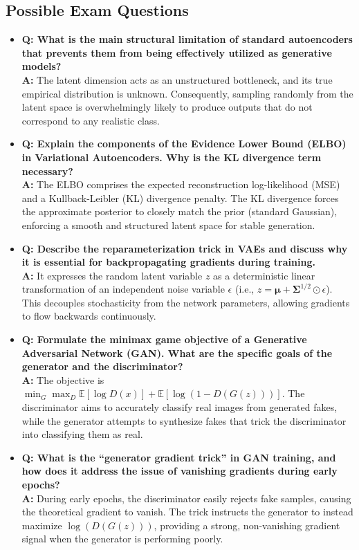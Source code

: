 \subsection{Possible Exam Questions}
\begin{itemize}
    \item \textbf{Q: What is the main structural limitation of standard autoencoders that prevents them from being effectively utilized as generative models?} \\
    \textbf{A:} The latent dimension acts as an unstructured bottleneck, and its true empirical distribution is unknown. Consequently, sampling randomly from the latent space is overwhelmingly likely to produce outputs that do not correspond to any realistic class.
    
    \item \textbf{Q: Explain the components of the Evidence Lower Bound (ELBO) in Variational Autoencoders. Why is the KL divergence term necessary?} \\
    \textbf{A:} The ELBO comprises the expected reconstruction log-likelihood (MSE) and a Kullback-Leibler (KL) divergence penalty. The KL divergence forces the approximate posterior to closely match the prior (standard Gaussian), enforcing a smooth and structured latent space for stable generation.
    
    \item \textbf{Q: Describe the reparameterization trick in VAEs and discuss why it is essential for backpropagating gradients during training.} \\
    \textbf{A:} It expresses the random latent variable $z$ as a deterministic linear transformation of an independent noise variable $\epsilon$ (i.e., $z = \boldsymbol{\mu} + \boldsymbol{\Sigma}^{1/2} \odot \epsilon$). This decouples stochasticity from the network parameters, allowing gradients to flow backwards continuously.
    
    \item \textbf{Q: Formulate the minimax game objective of a Generative Adversarial Network (GAN). What are the specific goals of the generator and the discriminator?} \\
    \textbf{A:} The objective is $\min_{G} \max_{D} \mathbb{E}[\log D(x)] + \mathbb{E}[\log(1 - D(G(z)))]$. The discriminator aims to accurately classify real images from generated fakes, while the generator attempts to synthesize fakes that trick the discriminator into classifying them as real.
    
    \item \textbf{Q: What is the ``generator gradient trick'' in GAN training, and how does it address the issue of vanishing gradients during early epochs?} \\
    \textbf{A:} During early epochs, the discriminator easily rejects fake samples, causing the theoretical gradient to vanish. The trick instructs the generator to instead maximize $\log(D(G(z)))$, providing a strong, non-vanishing gradient signal when the generator is performing poorly.
    

\end{itemize}
